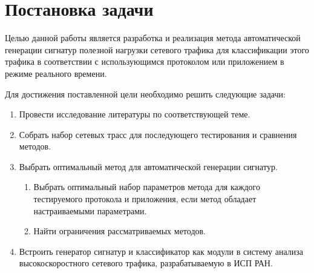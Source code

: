 \section{Постановка задачи}
\label{sec:Section1} 

Целью данной работы является разработка и реализация метода автоматической генерации сигнатур полезной нагрузки сетевого трафика
для классификации этого трафика в соответствии с использующимся протоколом или приложением в режиме реального времени.

Для достижения поставленной цели необходимо решить следующие задачи:

\begin{enumerate}
    \item Провести исследование литературы по соответствующей теме.
    \item Собрать набор сетевых трасс для последующего тестирования и сравнения методов.
    \item Выбрать оптимальный метод для автоматической генерации сигнатур.
    \begin{enumerate}
        \item Выбрать оптимальный набор параметров метода для каждого тестируемого протокола и приложения, если метод обладает настраиваемыми параметрами.
        \item Найти ограничения рассматриваемых методов.
    \end{enumerate}
    \item Встроить генератор сигнатур и классификатор как модули в систему анализа высокоскоростного сетевого трафика, разрабатываемую в ИСП РАН.
\end{enumerate}

\newpage

